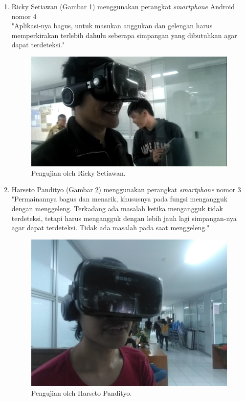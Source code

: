 \begin{enumerate}
    \item Ricky Setiawan (Gambar \ref{fig:pengujian_ricky_setiawan}) menggunakan perangkat \textit{smartphone} Android nomor 4\\
    "Aplikasi-nya bagus, untuk masukan anggukan dan gelengan harus memperkirakan terlebih dahulu seberapa simpangan yang dibutuhkan agar dapat terdeteksi."
    
    \begin{figure}[htbp]
    \centering
    \includegraphics[scale=0.35]{Gambar/PengujianEksperimental/RickySetiawan.jpg}
    \caption{Pengujian oleh Ricky Setiawan.} 
    \label{fig:pengujian_ricky_setiawan}
    \end{figure}
    
    \item Harseto Pandityo (Gambar \ref{fig:pengujian_harseto_pandityo}) menggunakan perangkat \textit{smartphone} nomor 3\\
    "Permainannya bagus dan menarik, khususnya pada fungsi mengangguk dengan menggeleng. Terkadang ada masalah ketika mengangguk tidak terdeteksi, tetapi harus mengangguk dengan lebih jauh lagi simpangan-nya agar dapat terdeteksi. Tidak ada masalah pada saat menggeleng."
    
    \begin{figure}[htbp]
    \centering
    \includegraphics[scale=0.07]{Gambar/PengujianEksperimental/HarsetoPandityo.jpg}
    \caption{Pengujian oleh Harseto Pandityo.} 
    \label{fig:pengujian_harseto_pandityo}
    \end{figure}
    

\end{enumerate}
